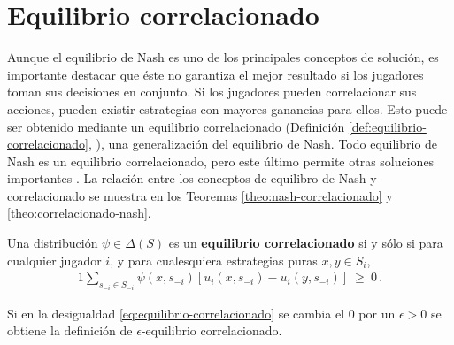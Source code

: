\section{Equilibrio correlacionado}

Aunque el equilibrio de Nash es uno de los principales conceptos de solución, es importante destacar que éste no garantiza el mejor resultado si los jugadores toman sus decisiones en conjunto. Si los jugadores pueden correlacionar sus acciones, pueden existir estrategias con mayores ganancias para ellos. 
Esto puede ser obtenido mediante un equilibrio correlacionado (Definición \ref{def:equilibrio-correlacionado}, \cite{bib:correlated-equilibrium}), una generalización del equilibrio de Nash. Todo equilibrio de Nash es un equilibrio correlacionado, pero este último permite otras soluciones importantes \cite{bib:correlated-equilibrium}. La relación entre los conceptos de equilibro de Nash y correlacionado se muestra en los Teoremas \ref{theo:nash-correlacionado} y \ref{theo:correlacionado-nash}.

\begin{definition}
\label{def:equilibrio-correlacionado}
Una distribución $\psi\in\Delta(S)$ es un \textbf{equilibrio correlacionado} si y sólo si para cualquier jugador $i$, y para cualesquiera estrategias puras $x, y \in S_i$,
\begin{alignat}{1}
\label{eq:equilibrio-correlacionado}
\sum_{s_{-i}\in S_{-i}} \psi(x,s_{-i}) [ u_i(x,s_{-i}) - u_i(y,s_{-i})]\ \geq\ 0 \,.
\end{alignat}
\end{definition}

Si en la desigualdad \eqref{eq:equilibrio-correlacionado} se cambia el $0$ por un $\epsilon > 0$ se obtiene la definición de $\epsilon$-equilibrio correlacionado.


